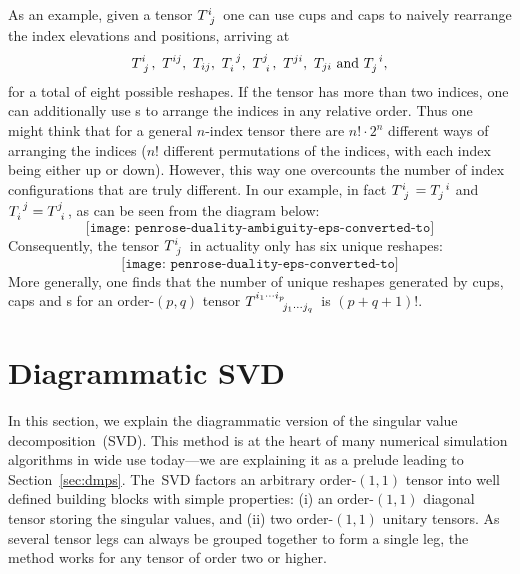 \documentclass[aps,pra,12pt,nofootinbib,superscriptaddress,longbibliography]{revtex4-1}
\newcommand{\vb}[1]{}
\theoremstyle{plain}
\theoremstyle{definition}
\newcommand{\bra}[1]{\mbox{$\langle #1|$}}
\newcommand{\ket}[1]{\mbox{$|#1\rangle$}}
\newcommand{\swap}{{\sf{SWAP}}}
\newcommand{\be}{\begin{equation}}
\newcommand{\ee}{\end{equation}}
\begin{document}
As an example, given a tensor $T\indices{^{i}_{j}}$ one can use cups and caps to naively rearrange the index elevations and positions, arriving at
\be 
T\indices{^{i}_{j}}, ~ T^{ij}, ~ T_{ij}, ~ T\indices{_{i}^{j}},
~ T\indices{^{j}_{i}}, ~  T^{ji}, ~ T_{ji} ~ \text{and} ~ T\indices{_{j}^{i}},
\ee 
for a total of eight possible reshapes. 
If the tensor has more than two indices, one can additionally use \swap{}s to
arrange the indices in any relative order.
Thus one might think that for a general $n$-index tensor
there are $n! \cdot 2^n$ different ways of arranging the indices
($n!$ different permutations of the indices, with each index being either up or down).
However, this way one overcounts the number of index configurations that are truly different.
In our example, in fact
$T\indices{^{i}_{j}} = T\indices{_{j}^{i}}$
and
$T\indices{_{i}^{j}} = T\indices{^{j}_{i}}$,
as can be seen from the diagram below:
\be
 \texttt{[image: penrose-duality-ambiguity-eps-converted-to]}
\ee
Consequently, the tensor $T\indices{^{i}_{j}}$
in actuality only has six unique reshapes:
\be
 \texttt{[image: penrose-duality-eps-converted-to]}
\ee
More generally, one finds that the number of unique
reshapes generated by cups, caps and \swap{}s for an \mbox{order-$(p,q)$} tensor
$T\indices{^{i_1\cdots i_p}_{j_1 \cdots j_q}}$
is $(p+q+1)!$. 

\section{Diagrammatic SVD}\label{sec:diagrammaticSVD}

In this section, we explain the diagrammatic version of
the singular value decomposition~(SVD).  This method is at the heart of many
numerical simulation algorithms in wide use today---we are explaining it as a prelude leading to Section~\ref{sec:dmps}.
The~SVD factors an arbitrary order-$(1,1)$ tensor into well defined building blocks
with simple properties:
(i) an order-$(1,1)$ diagonal tensor storing the singular values, and
(ii) two order-$(1,1)$ unitary tensors.
As several tensor legs can always be grouped together to form a single leg, the method works for any tensor of order two or higher.
\end{document}
